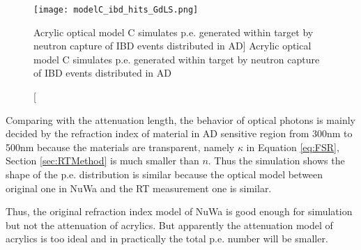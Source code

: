 \begin{figure}
    \centering
    \texttt{[image: modelC\_ibd\_hits\_GdLS.png]}
    \caption
    [Acrylic optical model C simulates p.e. generated within target by neutron capture of IBD events distributed in AD]
    {Acrylic optical model C simulates p.e. generated within target by neutron capture of IBD events distributed in AD}
    \label{fig:modelC_6mev_gamma_peGen.png}
    \end{figure}


Comparing with the attenuation length, the behavior of optical photons is mainly decided by the refraction index of material in AD sensitive
region from 300nm to 500nm because the materials are transparent, namely $\kappa$ in Equation \ref{eq:FSR}, Section \ref{sec:RTMethod}
is much smaller than $n$. Thus the simulation shows the shape of the p.e. distribution is similar
because the optical model between original one in NuWa and the RT measurement one is similar.




Thus, the original refraction index model of NuWa is good enough for simulation but not the attenuation of acrylics.
But apparently the attenuation model of acrylics is too ideal and in practically the total p.e. number will be smaller.



